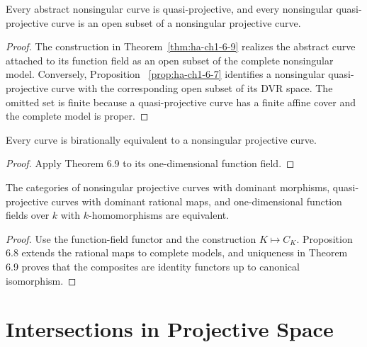 \begin{corollary}
\label{cor:ha-ch1-6-10}
Every abstract nonsingular curve is quasi-projective, and every nonsingular quasi-projective curve is
an open subset of a nonsingular projective curve.
\end{corollary}
\begin{proof}
The construction in Theorem~\ref{thm:ha-ch1-6-9} realizes the abstract curve attached to its
function field as an open subset of the complete nonsingular model.  Conversely, Proposition
~\ref{prop:ha-ch1-6-7} identifies a nonsingular quasi-projective curve with the corresponding open
subset of its DVR space.  The omitted set is finite because a quasi-projective curve has a finite
affine cover and the complete model is proper.
\end{proof}

\begin{corollary}
\label{cor:ha-ch1-6-11}
Every curve is birationally equivalent to a nonsingular projective curve.
\end{corollary}
\begin{proof}
Apply Theorem 6.9 to its one-dimensional function field.
\end{proof}

\begin{corollary}
\label{cor:ha-ch1-6-12}
The categories of nonsingular projective curves with dominant morphisms, quasi-projective curves
with dominant rational maps, and one-dimensional function fields over $k$ with $k$-homomorphisms
are equivalent.
\end{corollary}
\begin{proof}
Use the function-field functor and the construction $K\mapsto C_K$.  Proposition 6.8 extends the
rational maps to complete models, and uniqueness in Theorem 6.9 proves that the composites are
identity functors up to canonical isomorphism.
\end{proof}

\section{Intersections in Projective Space}

